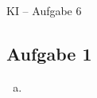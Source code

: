 \documentclass[a4paper,10pt]{article}
\begin{document}
\begin{center}
\Large{KI -- Aufgabe 6} \\
\end{center}

\subsection*{Aufgabe 1}
\begin{enumerate}[a)]

\item
		
\end{enumerate}
\end{document}
